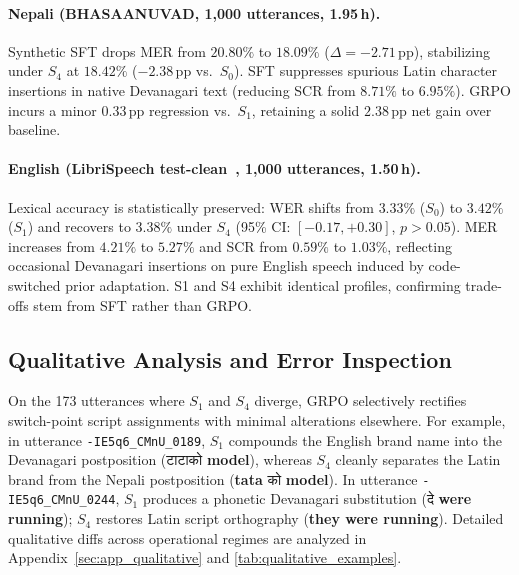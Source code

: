 \documentclass[10pt,twocolumn,a4paper]{article}
\newcommand{\dev}[1]{{\devfont #1}}
\newcommand{\sys}[1]{$S_{#1}$}
\newcommand{\pp}{\,\text{pp}}
\begin{document}
\paragraph{Nepali (BHASAANUVAD, 1,000 utterances, 1.95\,h).}
Synthetic SFT drops MER from $20.80\%$ to $18.09\%$ ($\Delta = -2.71\pp$), stabilizing under \sys{4} at $18.42\%$ ($-2.38\pp$ vs.\ \sys{0}). SFT suppresses spurious Latin character insertions in native Devanagari text (reducing SCR from $8.71\%$ to $6.95\%$). GRPO incurs a minor $0.33\pp$ regression vs.\ \sys{1}, retaining a solid $2.38\pp$ net gain over baseline.

\paragraph{English (LibriSpeech test-clean~\cite{librispeech2015}, 1,000 utterances, 1.50\,h).}
Lexical accuracy is statistically preserved: WER shifts from $3.33\%$ (\sys{0}) to $3.42\%$ (\sys{1}) and recovers to $3.38\%$ under \sys{4} (95\% CI: $[-0.17, +0.30]$, $p > 0.05$). MER increases from $4.21\%$ to $5.27\%$ and SCR from $0.59\%$ to $1.03\%$, reflecting occasional Devanagari insertions on pure English speech induced by code-switched prior adaptation. S1 and S4 exhibit identical profiles, confirming trade-offs stem from SFT rather than GRPO.

\subsection{Qualitative Analysis and Error Inspection}
On the 173 utterances where \sys{1} and \sys{4} diverge, GRPO selectively rectifies switch-point script assignments with minimal alterations elsewhere. For example, in utterance \texttt{-IE5q6\_CMnU\_0189}, \sys{1} compounds the English brand name into the Devanagari postposition (\dev{टाटाको} \textbf{model}), whereas \sys{4} cleanly separates the Latin brand from the Nepali postposition (\textbf{tata} \dev{को} \textbf{model}). In utterance \texttt{-IE5q6\_CMnU\_0244}, \sys{1} produces a phonetic Devanagari substitution (\dev{दे} \textbf{were running}); \sys{4} restores Latin script orthography (\textbf{they were running}). Detailed qualitative diffs across operational regimes are analyzed in Appendix~\ref{sec:app_qualitative} and \cref{tab:qualitative_examples}.

\clearpage
\end{document}
